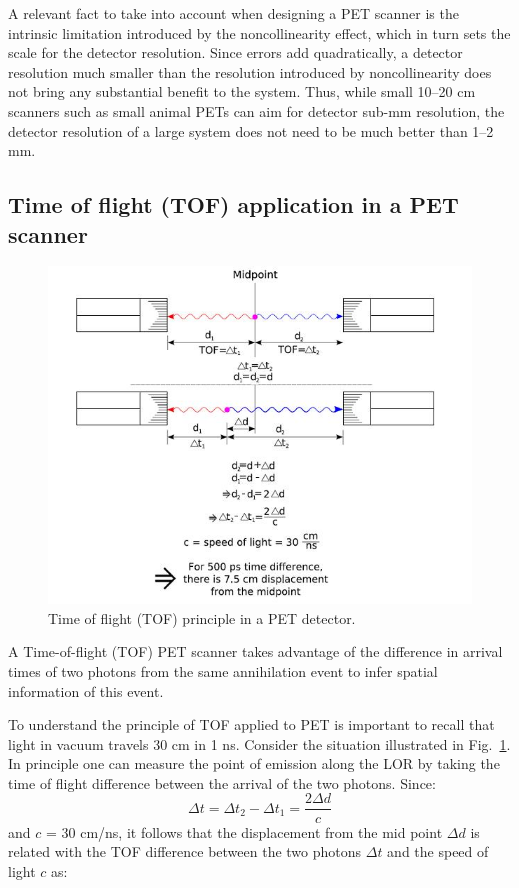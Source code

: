 \documentclass[review]{elsarticle}
\begin{document}
A relevant fact to take into account when designing a PET scanner is the intrinsic limitation introduced by the noncollinearity effect, which in turn sets the scale for the detector resolution. Since errors add quadratically, a detector resolution much smaller than the resolution introduced by noncollinearity does not bring any substantial benefit to the system. Thus, while small 10--20 cm scanners such as small animal PETs can aim for detector sub-mm resolution, the detector resolution of a large system does not need to be much better than 1--2 mm. 

\subsection*{Time of flight (TOF) application in a PET scanner}

\begin{figure}[!bthp]
	\centering
	\includegraphics[scale=1.0]{../img/MAPD_tofprinciple.jpg}
	\caption{\label{fig.tof} Time of flight (TOF) principle in a PET detector.}
\end{figure}

A Time-of-flight (TOF) PET scanner takes advantage of the difference in arrival times of two photons from the same annihilation event to infer spatial information of this event. 

To understand the principle of TOF applied to PET is important to recall that light in vacuum travels 30 cm in 1 ns. Consider the situation illustrated in Fig.~\ref{fig.tof}. In principle one can measure the point of emission along the LOR by taking the time of flight difference between the arrival of the two photons. Since:
\begin{equation}
\Delta t = \Delta t_2 - \Delta t_1 = \frac{2 \Delta d}{c}
\end{equation}
%
and $c$ = 30 cm/ns, it follows that the displacement from the mid point
$\Delta d$ is related with the TOF difference between the two photons $\Delta t$ and the speed of light $c$ as:
\end{document}
